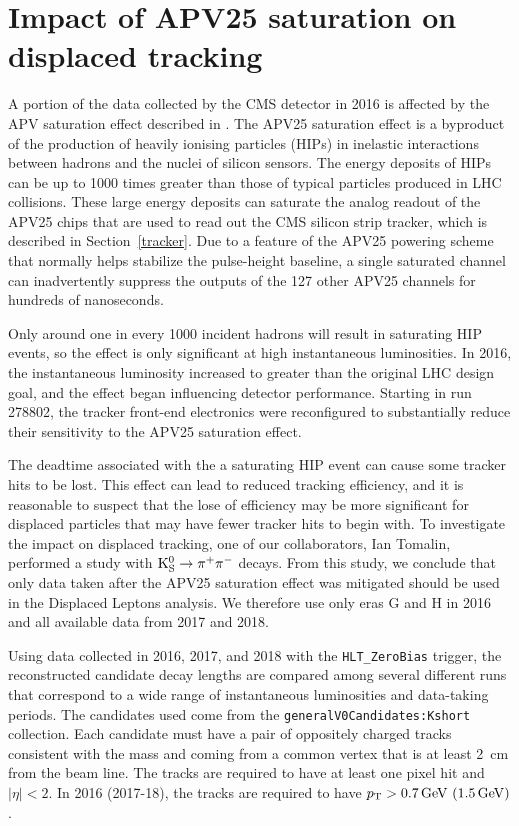 \chapter{Impact of APV25 saturation on displaced tracking}
\label{k0}
A portion of the data collected by the CMS detector in 2016 is affected by the APV saturation effect described in \cite{hip_study}. The APV25 saturation effect is a byproduct of the production of heavily ionising particles (HIPs) in inelastic interactions between hadrons and the nuclei of silicon sensors. The energy deposits of HIPs can be up to 1000 times greater than those of typical particles produced in LHC collisions. These large energy deposits can saturate the analog readout of the APV25 chips \cite{apv25} that are used to read out the CMS silicon strip tracker, which is described in Section~\ref{tracker}. Due to a feature of the APV25 powering scheme that normally helps stabilize the pulse-height baseline, a single saturated channel can inadvertently suppress the outputs of the 127 other APV25 channels for hundreds of nanoseconds.

Only around one in every 1000 incident hadrons will result in saturating HIP events, so the effect is only significant at high instantaneous luminosities. In 2016, the instantaneous luminosity increased to greater than the original LHC design goal, and the effect began influencing detector performance. Starting in run 278802, the tracker front-end electronics were reconfigured to substantially reduce their sensitivity to the APV25 saturation effect.

The deadtime associated with the a saturating HIP event can cause some tracker hits to be lost. This effect can lead to reduced tracking efficiency, and it is reasonable to suspect that the lose of efficiency may be more significant for displaced particles that may have fewer tracker hits to begin with. To investigate the impact on displaced tracking, one of our collaborators, Ian Tomalin, performed a study with $\mathrm{K^0_S}\to\pi^+\pi^-$ decays. From this study, we conclude that only data taken after the APV25 saturation effect was mitigated should be used in the Displaced Leptons analysis. We therefore use only eras G and H in 2016 and all available data from 2017 and 2018.

Using data collected in 2016, 2017, and 2018 with the \texttt{HLT\_ZeroBias} trigger, the reconstructed \Kzero candidate decay lengths are compared among several different runs that correspond to a wide range of instantaneous luminosities and data-taking periods. The \Kzero candidates used come from the \texttt{generalV0Candidates:Kshort} collection. Each candidate must have a pair of oppositely charged tracks consistent with the \Kzero mass and coming from a common vertex that is at least \SI{2}{\cm} from the beam line. The tracks are required to have at least one pixel hit and $|\eta|<2$. In 2016 (2017-18), the tracks are required to have $\pt>\SI{0.7}{\GeV}\ (\SI{1.5}{\GeV})$.

